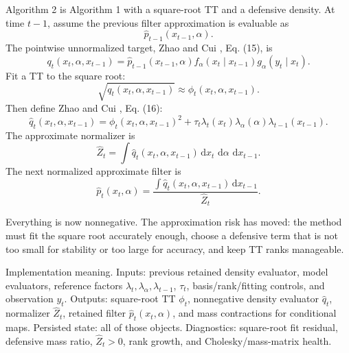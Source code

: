 \documentclass[11pt]{article}
\numberwithin{equation}{section}
\newcommand{\dd}{\,\mathrm d}
\begin{document}
Algorithm 2 is Algorithm 1 with a square-root TT and a defensive density.
At time \(t-1\), assume the previous filter approximation is evaluable as
\[
    \widehat p_{t-1}(x_{t-1},\alpha).
\]
The pointwise unnormalized target, Zhao and Cui \cite{zhao2024ttsequential}, Eq. (15), is
\begin{equation}
    q_t(x_t,\alpha,x_{t-1})
    =
    \widehat p_{t-1}(x_{t-1},\alpha)
    f_\alpha(x_t\mid x_{t-1})
    g_\alpha(y_t\mid x_t).
    \label{eq:p24-a2-1}
\end{equation}
Fit a TT to the square root:
\begin{equation}
    \sqrt{q_t(x_t,\alpha,x_{t-1})}
    \approx
    \phi_t(x_t,\alpha,x_{t-1}).
    \label{eq:p24-a2-2}
\end{equation}
Then define Zhao and Cui \cite{zhao2024ttsequential}, Eq. (16):
\begin{equation}
    \widehat q_t(x_t,\alpha,x_{t-1})
    =
    \phi_t(x_t,\alpha,x_{t-1})^2
    +
    \tau_t\lambda_t(x_t)\lambda_\alpha(\alpha)\lambda_{t-1}(x_{t-1}).
    \label{eq:p24-a2-3}
\end{equation}
The approximate normalizer is
\begin{equation}
    \widehat Z_t
    =
    \int \widehat q_t(x_t,\alpha,x_{t-1})
    \dd x_t\,\dd\alpha\,\dd x_{t-1}.
    \label{eq:p24-a2-4}
\end{equation}
The next normalized approximate filter is
\begin{equation}
    \widehat p_t(x_t,\alpha)
    =
    \frac{\int \widehat q_t(x_t,\alpha,x_{t-1})\dd x_{t-1}}
    {\widehat Z_t}.
    \label{eq:p24-a2-5}
\end{equation}

Everything is now nonnegative.  The approximation risk has moved: the method
must fit the square root accurately enough, choose a defensive term that is not
too small for stability or too large for accuracy, and keep TT ranks manageable.

Implementation meaning. Inputs: previous retained density evaluator,
model evaluators, reference factors \(\lambda_t,\lambda_\alpha,\lambda_{t-1}\),
\(\tau_t\), basis/rank/fitting controls, and observation \(y_t\).  Outputs:
square-root TT \(\phi_t\), nonnegative density evaluator \(\widehat q_t\),
normalizer \(\widehat Z_t\), retained filter \(\widehat p_t(x_t,\alpha)\), and
mass contractions for conditional maps.  Persisted state: all of those objects.
Diagnostics: square-root fit residual, defensive mass ratio, \(\widehat Z_t>0\),
rank growth, and Cholesky/mass-matrix health.
\end{document}
